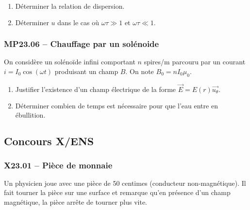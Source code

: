 \begin{enumerate}
    \item Déterminer la relation de dispersion.
    \item Déterminer $u$ dans le cas où $\omega\tau \gg 1$ et $\omega\tau \ll 1$.
\end{enumerate}

\subsubsection*{MP23.06 -- Chauffage par un solénoide }

On considère un solénoïde infini comportant $n$ spires/m parcouru par un courant $i = I_0 \cos(\omega t)$ produisant un champ $B$. On note $B_0 = n I_0 \mu_0$.

\begin{enumerate}
    \item Justifier l'existence d'un champ électrique de la forme $\overrightarrow{E} = E(r) \overrightarrow{u_\theta}$.
    \item Déterminer combien de temps est nécessaire pour que l'eau entre en ébullition.
\end{enumerate}

\newpage
\subsection*{Concours X/ENS}
\subsubsection*{X23.01 -- Pièce de monnaie  \corrige}


\begin{minipage}[t]{0.7\textwidth} %
Un physicien joue avec une pièce de 50 centimes (conducteur non-magnétique). Il fait tourner la pièce sur une surface et remarque qu'en présence d'un champ magnétique, la pièce arrête de tourner plus vite.
\end{minipage}
\hfill %
\begin{minipage}[t]{0.25\textwidth} %
~
\vspace{-0.5em}


\end{minipage}





